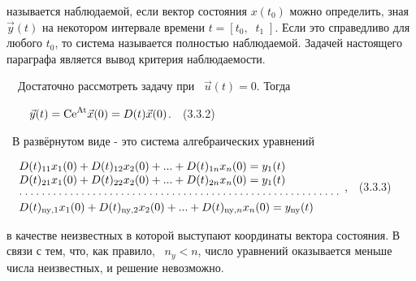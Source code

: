 \documentclass[a4paper]{article}
\newcommand\normalsubformula[1]{\text{\mathversion{normal}$#1$}}
\begin{document}
{\begin{russian}\sffamily
называется наблюдаемой, если вектор состояния  $x(t_0)$ можно определить, зная  $\vec y(t)$ на некотором интервале
времени  $t=[t_0,\;\;t_1\;]$. Если это справедливо для любого  $t_0$, то система называется полностью наблюдаемой.
Задачей настоящего параграфа является вывод критерия наблюдаемости.
\end{russian}}

{\begin{russian}\sffamily
\ \ Достаточно рассмотреть задачу при \  $\vec u(t)=0$. Тогда 
\end{russian}}

{\begin{russian}\sffamily
\ \ \ \  $\vec y(t)=\normalsubformula{\text{Ce}}^{\normalsubformula{\text{At}}}\vec x(0)=D(t)\vec x(0)$.\ \ (3.3.2)
\end{russian}}

{\begin{russian}\sffamily
\ В развёрнутом виде - это система алгебраических уравнений
\end{russian}}


\bigskip

{\begin{russian}\sffamily
\ \  $\begin{matrix}D(t)_{11}x_1(0)+D(t)_{12}x_2(0)+...+D(t)_{1n}x_n(0)=y_1(t)\hfill\null
\\D(t)_{21}x_1(0)+D(t)_{22}x_2(0)+...+D(t)_{2n}x_n(0)=y_1(t)\hfill\null \\\cdot \cdot \cdot \cdot \cdot \cdot \cdot
\cdot \cdot \cdot \cdot \cdot \cdot \cdot \cdot \cdot \cdot \cdot \cdot \cdot \cdot \cdot \cdot \cdot \cdot \cdot \cdot
\cdot \cdot \cdot \cdot \cdot \cdot \cdot \cdot \cdot \cdot \cdot \cdot \cdot \cdot \cdot \cdot \cdot \cdot \cdot \cdot
\cdot \cdot \cdot \cdot \cdot \cdot \cdot \cdot \cdot \cdot \hfill\null
\\D(t)_{\normalsubformula{\text{ny}},1}x_1(0)+D(t)_{\normalsubformula{\text{ny}},2}x_2(0)+...+D(t)_{\normalsubformula{\text{ny}},n}x_n(0)=y_{\normalsubformula{\text{ny}}}(t)\hfill\null
\end{matrix}\hfill $ ,\ \ (3.3.3)
\end{russian}}

{\begin{russian}\sffamily
в качестве неизвестных в которой выступают координаты вектора состояния. В связи с тем, что, как правило, \  $n_y<n$,
число уравнений оказывается меньше числа неизвестных, и решение невозможно.
\end{russian}}
\end{document}
